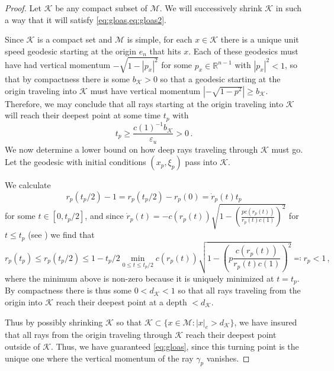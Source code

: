 \documentclass[
	fontsize=11pt, 
	twoside=false, 
	abstract=true, 
	a4paper,
]{scrartcl}
\newcommand{\eps}{\varepsilon}
\newcommand{\RR}{\mathbb{R}}
\newcommand{\abs}[1]{\left\lvert#1\right\rvert}
\begin{document}
\begin{proof}
	Let $\mathcal{K}$ be any compact subset of $\mathcal{M}$. We will successively shrink $\mathcal{K}$ in such a way that it will satisfy \cref{eq:gloas,eq:gloas2}.

	Since $\mathcal{K}$ is a compact set and $\mathcal{M}$ is simple, for each $x\in\mathcal{K}$ there is a unique unit speed geodesic starting at the origin $e_n$ that hits $x$. Each of these geodesics must have had vertical momentum $-\sqrt{1-\abs{p_x}^2}$ for some $p_x\in \RR^{n-1}$ with $\abs{p_x}^2 < 1$, so that by compactness there is some $b_{\mathcal{K}}>0$ so that a geodesic starting at the origin traveling into $\mathcal{K}$ must have vertical momentum $\abs{-\sqrt{1-p^2}} \geq b_{\mathcal{K}}$. Therefore, we may conclude that all rays starting at the origin traveling into $\mathcal{K}$ will reach their deepest point at some time $t_p$ with
%
%
	\[
		t_p \geq \frac{c(1)^{-1}b_{\mathcal{K}}}{\eps_u} > 0\,.
	\]
	We now determine a lower bound on how deep rays traveling through $\mathcal{K}$ must go. Let the geodesic with initial conditions $(x_p,\xi_p)$ pass into $\mathcal{K}$. %

	We calculate
	\[
		r_p(t_p/2) - 1 = r_p(t_p/2) - r_p(0) = \dot r_p(t) t_p
	\]
	for some $t\in [0,t_p/2]$, and since $\dot r_p(t) = -c(r_p(t))\sqrt{1-\left(\frac{pc(r_p(t))}{r_p(t)c(1)}\right)^2}$ for $t\leq t_p$ (see \cite[Eq.~(2.10)]{zbMATH07625517}) %
	we find that
	\[
		r_p(t_p) \leq r_p(t_p/2) \leq 1-t_p/2 \min_{0\leq t\leq t_p/2}c(r_p(t))\sqrt{1-\left(p\frac{c(r_p(t))}{r_p(t) c(1)}\right)^2} \eqqcolon r_p < 1\,,
	\]
	where the minimum above is non-zero because it is uniquely minimized at $t=t_p$. By compactness there is thus some $0<d_{\mathcal{K}}<1$ so that all rays traveling from the origin into $\mathcal{K}$ reach their deepest point at a depth $<d_{\mathcal{K}}$.

	Thus by possibly shrinking $\mathcal{K}$ so that $\mathcal{K} \subset \{x\in\mathcal{M}\colon\abs{x}_e >d_{\mathcal{K}}\}$, we have insured that all rays from the origin traveling through $\mathcal{K}$ reach their deepest point outside of $\mathcal{K}$. 
	Thus, we have guaranteed \cref{eq:gloas}, since this turning point is the unique one where the vertical momentum of the ray $\gamma_p$ vanishes. 


\end{proof}
\end{document}
